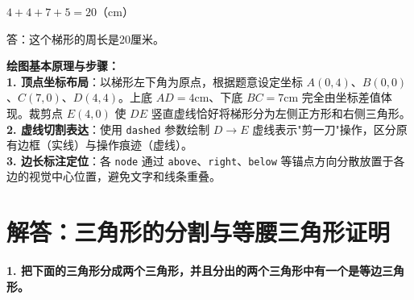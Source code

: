 \documentclass[12pt, a4paper]{ctexrep}
\begin{document}
\vspace{0.6cm}

\noindent
$4 + 4 + 7 + 5 = 20 \text{（cm）}$

\vspace{0.4cm}

\noindent
答：这个梯形的周长是20厘米。

\vspace{0.6cm}

{\small\color{blue!70!black}
\textbf{绘图基本原理与步骤：}\\
\textbf{1. 顶点坐标布局}：以梯形左下角为原点，根据题意设定坐标 $A(0,4)$、$B(0,0)$、$C(7,0)$、$D(4,4)$。上底 $AD=4$cm、下底 $BC=7$cm 完全由坐标差值体现。裁剪点 $E(4,0)$ 使 $DE$ 竖直虚线恰好将梯形分为左侧正方形和右侧三角形。\\
\textbf{2. 虚线切割表达}：使用 \texttt{dashed} 参数绘制 $D \to E$ 虚线表示"剪一刀"操作，区分原有边框（实线）与操作痕迹（虚线）。\\
\textbf{3. 边长标注定位}：各 \texttt{node} 通过 \texttt{above}、\texttt{right}、\texttt{below} 等锚点方向分散放置于各边的视觉中心位置，避免文字和线条重叠。
}



\newpage

\section{解答：三角形的分割与等腰三角形证明}

\vspace{0.4cm}

\noindent\textbf{1. 把下面的三角形分成两个三角形，并且分出的两个三角形中有一个是等边三角形。}

\vspace{0.6cm}
\end{document}
